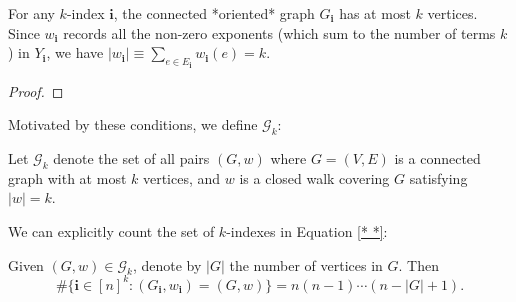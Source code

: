 
For any $k$-index $\mathbf{i}$, the connected *oriented* graph $G_\mathbf{i}$ has at most $k$ vertices. 
Since $w_\mathbf{i}$ records all the non-zero exponents (which sum to the number of terms $k$) in $Y_\mathbf{i}$, 
we have $|w_\mathbf{i}| \equiv \sum_{e \in E_\mathbf{i}} w_\mathbf{i}(e) = k$.

\begin{lemma}
  \label{lem:}
  \notready
  \uses{}
  

\end{lemma}
\begin{proof}

\end{proof}
Motivated by these conditions, we define $\mathcal{G}_k$:
\begin{definition}
  \label{def:}
  \uses{}
  Let $\mathcal{G}_k$ denote the set of all pairs $(G,w)$ where $G = (V,E)$ is a connected graph with at most $k$ vertices, and
  $w$ is a closed walk covering $G$ satisfying $|w| = k$.
\end{definition}
We can explicitly count the set of $k$-indexes in Equation \ref{* *}: 
\begin{lemma}
  \label{lem:}
  Given $(G,w) \in \mathcal{G}_k$, denote by $|G|$ the number of vertices in $G$. Then
  \[
  \# \{ \mathbf{i} \in [n]^k : (G_\mathbf{i},w_\mathbf{i}) = (G,w) \} = n (n-1) \cdots (n - |G| + 1).
  \]
\end{lemma}

